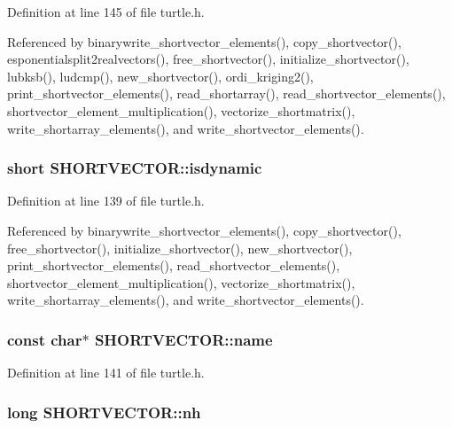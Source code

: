 Definition at line 145 of file turtle.\-h.



Referenced by binarywrite\-\_\-shortvector\-\_\-elements(), copy\-\_\-shortvector(), esponentialsplit2realvectors(), free\-\_\-shortvector(), initialize\-\_\-shortvector(), lubksb(), ludcmp(), new\-\_\-shortvector(), ordi\-\_\-kriging2(), print\-\_\-shortvector\-\_\-elements(), read\-\_\-shortarray(), read\-\_\-shortvector\-\_\-elements(), shortvector\-\_\-element\-\_\-multiplication(), vectorize\-\_\-shortmatrix(), write\-\_\-shortarray\-\_\-elements(), and write\-\_\-shortvector\-\_\-elements().

\hypertarget{struct_s_h_o_r_t_v_e_c_t_o_r_a6261fa9a3ba1332cd672c47835249872}{
\subsubsection[{isdynamic}]{\setlength{\rightskip}{0pt plus 5cm}short S\-H\-O\-R\-T\-V\-E\-C\-T\-O\-R\-::isdynamic}}\label{struct_s_h_o_r_t_v_e_c_t_o_r_a6261fa9a3ba1332cd672c47835249872}


Definition at line 139 of file turtle.\-h.



Referenced by binarywrite\-\_\-shortvector\-\_\-elements(), copy\-\_\-shortvector(), free\-\_\-shortvector(), initialize\-\_\-shortvector(), new\-\_\-shortvector(), print\-\_\-shortvector\-\_\-elements(), read\-\_\-shortvector\-\_\-elements(), shortvector\-\_\-element\-\_\-multiplication(), vectorize\-\_\-shortmatrix(), write\-\_\-shortarray\-\_\-elements(), and write\-\_\-shortvector\-\_\-elements().

\hypertarget{struct_s_h_o_r_t_v_e_c_t_o_r_a45a9e46d84edac7fe157ec909a812057}{
\subsubsection[{name}]{\setlength{\rightskip}{0pt plus 5cm}const char$\ast$ S\-H\-O\-R\-T\-V\-E\-C\-T\-O\-R\-::name}}\label{struct_s_h_o_r_t_v_e_c_t_o_r_a45a9e46d84edac7fe157ec909a812057}


Definition at line 141 of file turtle.\-h.

\hypertarget{struct_s_h_o_r_t_v_e_c_t_o_r_afb8a770698bf1400c8d17ccdedd9a696}{
\subsubsection[{nh}]{\setlength{\rightskip}{0pt plus 5cm}long S\-H\-O\-R\-T\-V\-E\-C\-T\-O\-R\-::nh}}\label{struct_s_h_o_r_t_v_e_c_t_o_r_afb8a770698bf1400c8d17ccdedd9a696}



